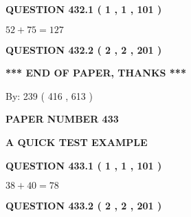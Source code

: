 \documentclass[12pt]{article}
\begin{document}
\vspace{0.2in}
  
{\textbf{\Large{QUESTION
432.1 
 ( 1 , 1 , 101 )
}}}
  
  
 
 

$ %
52 +  %
75=   %
127$
 
 
  
\vspace{0.2in}
  
{\textbf{\Large{QUESTION
432.2 
 ( 2 , 2 , 201 )
}}}
  
  
   
   
 \vspace{0.2in}
 
   
   
   
   
\vspace{1.0in} 
{\textbf{\large{ *** END OF PAPER, THANKS *** }}} 
   
   
\hspace{1.0in} By: 
 239 ( 416 ,  613 )
   
   
   
   
\newpage 
\setcounter{page}{ 
   433001 } 
   
   
   
   
 {\textbf{ \Large{ PAPER NUMBER  433  }}}
   
   
\vspace{0.2in}
   
   
   
   
   
   
 \vspace{0.2in}
{\LARGE {\textbf{ A QUICK TEST EXAMPLE}}}
   
   
  
\vspace{0.2in}
  
{\textbf{\Large{QUESTION
433.1 
 ( 1 , 1 , 101 )
}}}
  
  
 
 

$ %
38 +  %
40=   %
78$
 
 
  
\vspace{0.2in}
  
{\textbf{\Large{QUESTION
433.2 
 ( 2 , 2 , 201 )
}}}
  
  
   
   
 \vspace{0.2in}
 
\end{document}
